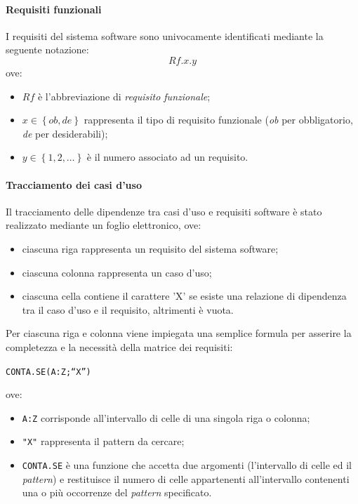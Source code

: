 \paragraph{Requisiti funzionali}
I requisiti del sistema software sono univocamente identificati mediante la seguente notazione:
$$Rf.x.y$$
ove:
\begin{itemize}
\item $Rf$ è l'abbreviazione di \textit{requisito funzionale};
\item $x \in \left\{ob,de\right\}$ rappresenta il tipo di requisito funzionale (\textit{ob} per obbligatorio, \textit{de} per desiderabili);
\item $y \in \left\{1,2,\ldots\right\}$ è il numero associato ad un requisito.
\end{itemize}

\paragraph{Tracciamento dei casi d'uso}
Il tracciamento delle dipendenze tra casi d'uso e requisiti software è stato realizzato mediante un foglio elettronico, ove:
\begin{itemize}
\item ciascuna riga rappresenta un requisito del sistema software;
\item ciascuna colonna rappresenta un caso d'uso;
\item ciascuna cella contiene il carattere 'X' se esiste una relazione di dipendenza tra il caso d'uso e il requisito, altrimenti è vuota.
\end{itemize}

Per ciascuna riga e colonna viene impiegata una semplice formula per asserire la completezza e la necessità della matrice dei requisiti:  
\begin{center}
\texttt{CONTA.SE(A:Z;``X'')}   
\end{center}
ove:
\begin{itemize}
\item \texttt{A:Z} corrisponde all'intervallo di celle di una singola riga o colonna;
\item \texttt{"X"} rappresenta il pattern da cercare;
\item \texttt{CONTA.SE} è una funzione che accetta due argomenti (l'intervallo di celle ed il \textit{pattern}) e restituisce il numero di celle appartenenti all'intervallo contenenti una o più occorrenze del \textit{pattern} specificato.
\end{itemize}

